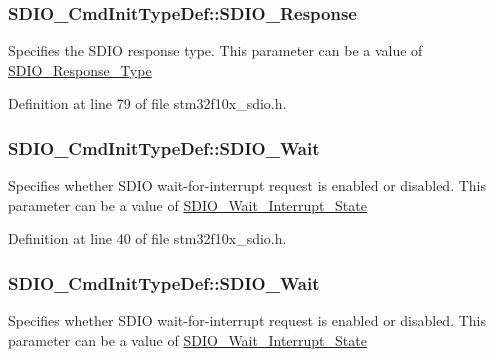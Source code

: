 \subsubsection[{\texorpdfstring{S\+D\+I\+O\+\_\+\+Response}{SDIO_Response}}]{ S\+D\+I\+O\+\_\+\+Cmd\+Init\+Type\+Def\+::\+S\+D\+I\+O\+\_\+\+Response}\hypertarget{struct_s_d_i_o___cmd_init_type_def_aecb203e21321126d5f05c34787cacfd2}{}\label{struct_s_d_i_o___cmd_init_type_def_aecb203e21321126d5f05c34787cacfd2}
Specifies the S\+D\+IO response type. This parameter can be a value of \hyperlink{group___s_d_i_o___response___type}{S\+D\+I\+O\+\_\+\+Response\+\_\+\+Type} 

Definition at line 79 of file stm32f10x\+\_\+sdio.\+h.

\subsubsection[{\texorpdfstring{S\+D\+I\+O\+\_\+\+Wait}{SDIO_Wait}}]{ S\+D\+I\+O\+\_\+\+Cmd\+Init\+Type\+Def\+::\+S\+D\+I\+O\+\_\+\+Wait}\hypertarget{struct_s_d_i_o___cmd_init_type_def_a5010f9ec3f62280b22bc6bb5b2d18111}{}\label{struct_s_d_i_o___cmd_init_type_def_a5010f9ec3f62280b22bc6bb5b2d18111}
Specifies whether S\+D\+IO wait-\/for-\/interrupt request is enabled or disabled. This parameter can be a value of \hyperlink{group___s_d_i_o___wait___interrupt___state}{S\+D\+I\+O\+\_\+\+Wait\+\_\+\+Interrupt\+\_\+\+State} 

Definition at line 40 of file stm32f10x\+\_\+sdio.\+h.

\subsubsection[{\texorpdfstring{S\+D\+I\+O\+\_\+\+Wait}{SDIO_Wait}}]{ S\+D\+I\+O\+\_\+\+Cmd\+Init\+Type\+Def\+::\+S\+D\+I\+O\+\_\+\+Wait}\hypertarget{struct_s_d_i_o___cmd_init_type_def_a582258554233ff8550bd04d2d790c67c}{}\label{struct_s_d_i_o___cmd_init_type_def_a582258554233ff8550bd04d2d790c67c}
Specifies whether S\+D\+IO wait-\/for-\/interrupt request is enabled or disabled. This parameter can be a value of \hyperlink{group___s_d_i_o___wait___interrupt___state}{S\+D\+I\+O\+\_\+\+Wait\+\_\+\+Interrupt\+\_\+\+State} 

